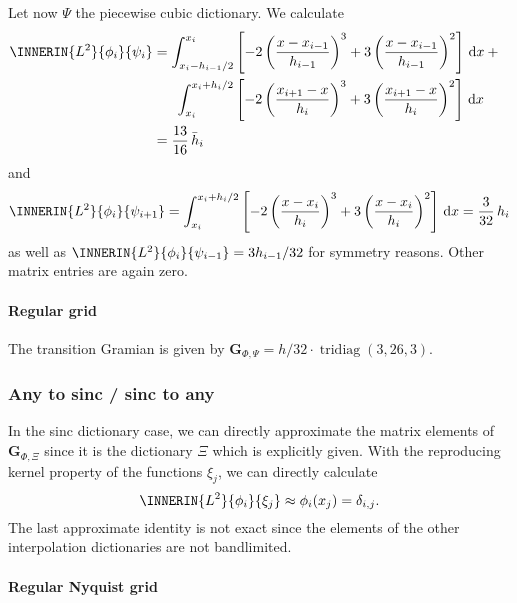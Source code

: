 \documentclass[a4paper]{paper}
\DeclareMathOperator{\TRIDIAG}{{tridiag}}
\newcommand*{\D}{{\ensuremath{\mathrm{d}}}}
\newcommand*{\BDG}{\boldsymbol{G}}
\begin{document}
Let now $\Psi$ the piecewise cubic dictionary. We calculate
%
\begin{align*}
 \INNERIN{L^2}{\phi_i}{\psi_i} 
 &= \int_{x_i - h_{i-1}/2}^{x_i} 
 \left[ -2\left( \frac{x-x_{i-1}}{h_{i-1}} \right)^3 + 3 \left( \frac{x-x_{i-1}}{h_{i-1}} \right)^2 
 \right]\, \D x + \phantom{x} \\
 &\hspace{16pt} \int_{x_i}^{x_i + h_i/2} 
 \left[ -2\left( \frac{x_{i+1}-x}{h_i} \right)^3 + 3\left( \frac{x_{i+1}-x}{h_i} \right)^2 
 \right]\, \D x \\
 &= \frac{13}{16}\, \bar h_i
\end{align*}
%
and
%
\begin{equation*}
 \INNERIN{L^2}{\phi_i}{\psi_{i+1}} 
 = \int_{x_i}^{x_i + h_i/2} 
 \left[ -2\left( \frac{x-x_i}{h_i} \right)^3 + 3 \left( \frac{x-x_i}{h_i} \right)^2 
 \right]\, \D x 
 = \frac{3}{32}\, h_i
\end{equation*}
%
as well as $\INNERIN{L^2}{\phi_i}{\psi_{i-1}} = 3h_{i-1}/32$ for symmetry reasons. Other matrix 
entries are again zero.

\paragraph{Regular grid}

The transition Gramian is given by $\BDG_{\Phi, \Psi} = h/32\cdot\TRIDIAG(3, 26, 3)$.

\subsubsection{Any to sinc / sinc to any}
\label{subsubsec:specif:rediscr:any2sinc}

In the sinc dictionary case, we can directly approximate the matrix elements of $\BDG_{\Phi, \Xi}$ since it is the 
dictionary $\Xi$ which is explicitly given. With the reproducing kernel property of the functions $\xi_j$, we 
can directly calculate
%
\begin{equation*}
 \INNERIN{L^2}{\phi_i}{\xi_j} \approx \phi_i(x_j) = \delta_{i,j}.
\end{equation*}
%
The last approximate identity is not exact since the elements of the other interpolation dictionaries are not 
bandlimited.

\paragraph{Regular Nyquist grid}
\end{document}

